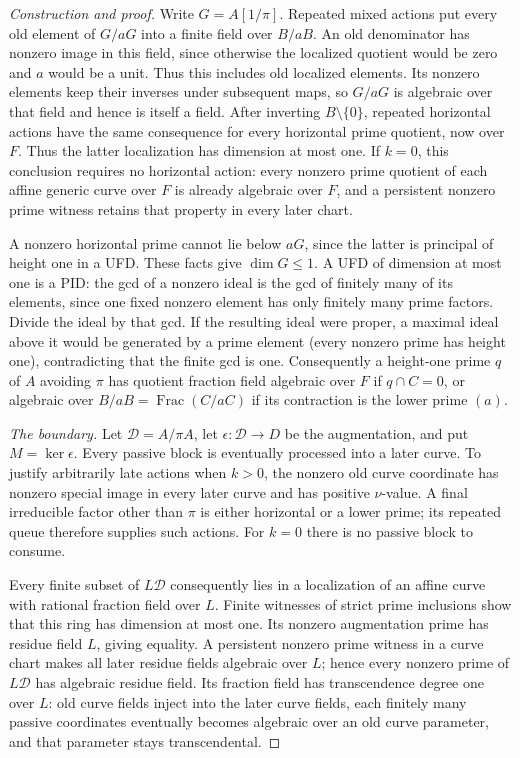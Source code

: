 \documentclass[11pt,reqno]{amsart}
\numberwithin{equation}{section}
\theoremstyle{plain}
\theoremstyle{definition}
\theoremstyle{remark}
\begin{document}
\begin{proof}[Construction and proof]
Write \(G=A[1/\pi]\).  Repeated mixed actions put every old
element of \(G/aG\) into a finite field over \(B/aB\).
An old denominator has nonzero image in this field, since otherwise
the localized quotient would be zero and \(a\) would be a unit.
Thus this includes old localized elements.
Its nonzero elements keep their inverses under subsequent maps,
so \(G/aG\) is algebraic over that field and hence is itself
a field.  After inverting \(B\setminus\{0\}\), repeated
horizontal actions have the same consequence for every
horizontal prime quotient, now over \(F\).  Thus the latter
localization has dimension at most one.  If \(k=0\), this
conclusion requires no horizontal action: every nonzero prime
quotient of each affine generic curve over \(F\) is already
algebraic over \(F\), and a persistent nonzero prime witness
retains that property in every later chart.

A nonzero horizontal prime cannot lie below \(aG\), since
the latter is principal of height one in a UFD.  These facts
give \(\dim G\le1\).  A UFD of dimension at most one is a
PID: the gcd of a nonzero ideal is the gcd of finitely many
of its elements, since one fixed nonzero element has only
finitely many prime factors.  Divide the ideal by that gcd.
If the resulting ideal were proper, a maximal ideal above it
would be generated by a prime element (every nonzero prime
has height one), contradicting that the finite gcd is one.
Consequently a height-one prime \(q\) of \(A\) avoiding \(\pi\)
has quotient fraction field algebraic over \(F\) if \(q\cap C=0\),
or algebraic over \(B/aB=\operatorname{Frac}(C/aC)\) if its
contraction is the lower prime \((a)\).

\smallskip\noindent\emph{The boundary.}
Let \(\mathcal D=A/\pi A\), let
\(\epsilon:\mathcal D\to D\) be the augmentation, and put
\(M=\ker\epsilon\).  Every passive block is eventually
processed into a later curve.  To justify arbitrarily late
actions when \(k>0\), the nonzero old curve coordinate has
nonzero special image in every later curve and has positive
\(\nu\)-value.  A final irreducible factor other than \(\pi\)
is either horizontal or a lower prime; its repeated queue
therefore supplies such actions.  For \(k=0\) there is no
passive block to consume.

Every finite subset of \(L\mathcal D\) consequently lies in a
localization of an affine curve with rational fraction field
over \(L\).  Finite witnesses of strict prime inclusions show
that this ring has dimension at most one.  Its nonzero
augmentation prime has residue field \(L\), giving equality.
A persistent nonzero prime witness in a curve chart makes all
later residue fields algebraic over \(L\); hence every nonzero
prime of \(L\mathcal D\) has algebraic residue field.  Its
fraction field has transcendence degree one over \(L\): old
curve fields inject into the later curve fields, each finitely
many passive coordinates eventually becomes algebraic over an
old curve parameter, and that parameter stays transcendental.


\end{proof}
\end{document}
